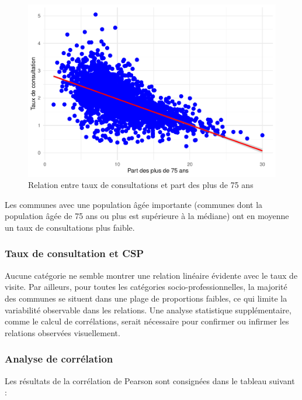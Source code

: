 \begin{figure}

{\centering \includegraphics{4_Analyse_Descriptive_files/figure-latex/unnamed-chunk-9-1} 

}

\caption{Relation entre taux de consultations et part des plus de 75 ans}\label{fig:unnamed-chunk-9}
\end{figure}

Les communes avec une population âgée importante (communes dont la
population âgée de 75 ans ou plus est supérieure à la médiane) ont en
moyenne un taux de consultations plus faible.

\subsubsection{Taux de consultation et
CSP}\label{taux-de-consultation-et-csp}

Aucune catégorie ne semble montrer une relation linéaire évidente avec
le taux de visite. Par ailleurs, pour toutes les catégories
socio-professionnelles, la majorité des communes se situent dans une
plage de proportions faibles, ce qui limite la variabilité observable
dans les relations. Une analyse statistique supplémentaire, comme le
calcul de corrélations, serait nécessaire pour confirmer ou infirmer les
relations observées visuellement.

\subsubsection{Analyse de corrélation}\label{analyse-de-corruxe9lation}

Les résultats de la corrélation de Pearson sont consignées dans le
tableau suivant :

